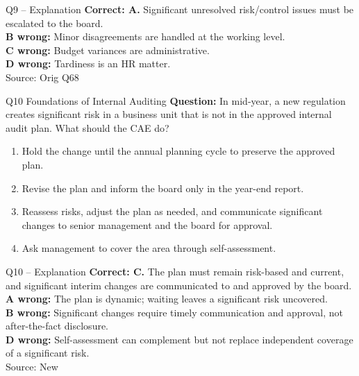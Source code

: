 \documentclass[aspectratio=169,10pt]{beamer}
\begin{document}
\begin{frame}[t]{Q9 -- Explanation}
	\footnotesize
	\textbf{Correct: A.} Significant unresolved risk/control issues must be escalated to the board. \\[5pt]
\textbf{B wrong:} Minor disagreements are handled at the working level. \\[3pt]
\textbf{C wrong:} Budget variances are administrative. \\[3pt]
\textbf{D wrong:} Tardiness is an HR matter. \\[3pt]
	\vfill {\tiny Source: Orig Q68}
\end{frame}

\begin{frame}[t]{Q10 \hfill {\scriptsize Foundations of Internal Auditing}}
	\small
	\textbf{Question:} In mid-year, a new regulation creates significant risk in a business unit that is not in the approved internal audit plan. What should the CAE do?
	\begin{enumerate}[label=\Alph*.,itemsep=1pt,topsep=3pt]
			\item Hold the change until the annual planning cycle to preserve the approved plan.
			\item Revise the plan and inform the board only in the year-end report.
			\item Reassess risks, adjust the plan as needed, and communicate significant changes to senior management and the board for approval.
			\item Ask management to cover the area through self-assessment.
	\end{enumerate}
\end{frame}

\begin{frame}[t]{Q10 -- Explanation}
	\footnotesize
	\textbf{Correct: C.} The plan must remain risk-based and current, and significant interim changes are communicated to and approved by the board. \\[5pt]
\textbf{A wrong:} The plan is dynamic; waiting leaves a significant risk uncovered. \\[3pt]
\textbf{B wrong:} Significant changes require timely communication and approval, not after-the-fact disclosure. \\[3pt]
\textbf{D wrong:} Self-assessment can complement but not replace independent coverage of a significant risk. \\[3pt]
	\vfill {\tiny Source: New}
\end{frame}
\end{document}
